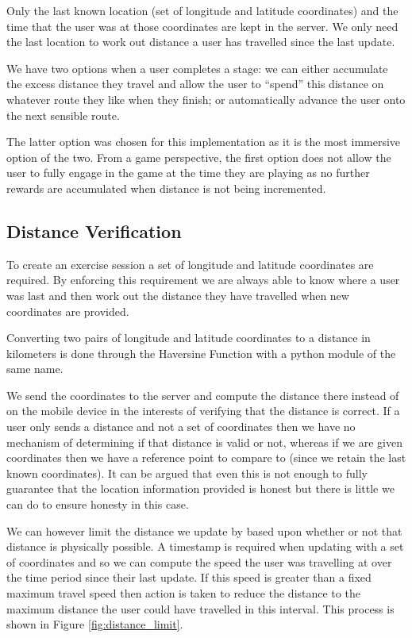 Only the last known location (set of longitude and latitude
coordinates) and the time that the user was at those coordinates are
kept in the server. We only need the last location 
to work out distance a user has travelled since the last update. 

We have two options when a user completes a stage: we can either
accumulate the excess distance they travel and allow the user to
``spend'' this distance on whatever route they like when they finish;
or automatically advance the user onto the next sensible route. 

The latter option was chosen for this implementation as it is the most
immersive option of the two. From a game perspective, the first option
does not allow the user to fully engage in the game at the time they
are playing as no further rewards are accumulated when distance is not
being incremented. 


\subsection{Distance Verification}
\label{sec:distance_ver}
To create an exercise session a set of longitude and latitude
coordinates are required. By enforcing this requirement we are always
able to know where a user was last and then work out the distance they
have travelled when new coordinates are provided. 

Converting two pairs of longitude and latitude coordinates to a
distance in kilometers is done through the Haversine
Function\cite{haversine} with a python module of the same
name\cite{python_haversine}.

We send the coordinates to the server and compute the distance there
instead of on the mobile device in the interests of verifying that
the distance is correct. If a user only sends a distance and not a
set of coordinates then we have no mechanism of determining if that
distance is valid or not, whereas if we are given coordinates then we
have a reference point to compare to (since we retain the last known
coordinates). It can be argued that even this is not enough to fully
guarantee that the location information provided is honest but there
is little we can do to ensure honesty in this case. 

We can however limit the distance we update by based upon whether or
not that distance is physically possible. A timestamp is required when
updating with a set of coordinates and so we can compute the speed the
user was travelling at over the time period since their last
update. If this speed is greater than a fixed maximum travel speed
then action is taken to reduce the distance to the maximum distance
the user could have travelled in this interval. This process is shown
in Figure \ref{fig:distance_limit}.

